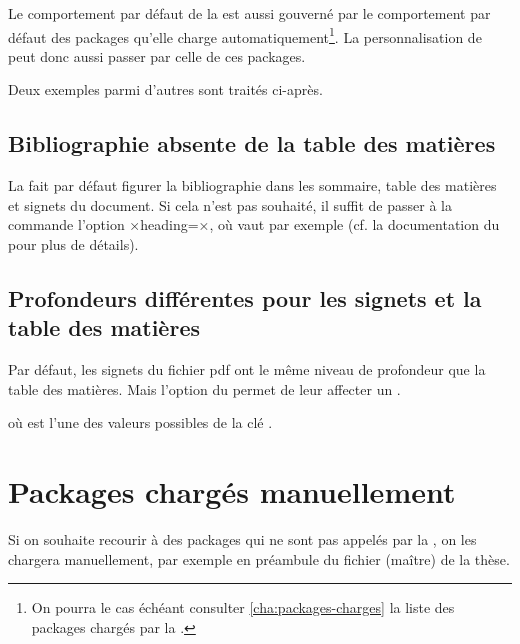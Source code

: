 Le comportement par défaut de la \yatcl{} est aussi gouverné par le
comportement par défaut des packages qu'elle charge
automatiquement\footnote{ On pourra le cas échéant consulter
  \vref{cha:packages-charges} la liste des packages chargés par la \yatcl{}.}.
La personnalisation de \yat{} peut donc aussi passer par celle de ces packages.

Deux exemples parmi d'autres sont traités ci-après.

\subsection{Bibliographie absente de la table des matières}

La \yatcl{} fait par défaut figurer la bibliographie dans les sommaire, table
des matières et signets du document. Si cela n'est pas souhaité, il suffit de
passer à la commande  l'option
×heading=×, où  vaut par exemple
 (cf. la documentation du  pour plus
de détails).

\subsection{Profondeurs différentes pour les signets et la table des matières}

Par défaut, les signets du fichier \acrshort{pdf} ont le même niveau de
profondeur que la table des matières. Mais l'option 
du  permet de leur affecter un .
\begin{preamblecode}[title=Par exemple dans le \File{\configurationfile}]
\end{preamblecode}
où  est l'une des valeurs possibles de la clé
.

\section{Packages chargés manuellement}
\label{sec:options-de-classes}
Si on souhaite recourir à des packages qui ne sont pas appelés par la \yatcl{},
on les chargera manuellement, par exemple en préambule du fichier (maître) de
la thèse.
%
\iffalse
\fi
